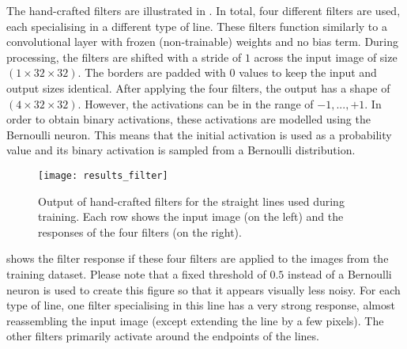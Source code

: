 The hand-crafted filters are illustrated in .
In total, four different filters are used, each specialising in a different type of line.
These filters function similarly to a convolutional layer with frozen (non-trainable) weights and no bias term. 
During processing, the filters are shifted with a stride of $1$ across the input image of size $(1 \times 32 \times 32)$. 
The borders are padded with $0$ values to keep the input and output sizes identical.
After applying the four filters, the output has a shape of $(4 \times 32 \times 32)$. 
However, the activations can be in the range of $-1, ..., +1$.
In order to obtain binary activations, these activations are modelled using the Bernoulli neuron.
This means that the initial activation is used as a probability value and its binary activation is sampled from a Bernoulli distribution.


\begin{figure}[h]
    \centering
    \texttt{[image: results\_filter]}
    \caption[Output of hand-crafted filters for straight lines]{Output of hand-crafted filters for the straight lines used during training. Each row shows the input image (on the left) and the responses of the four filters (on the right).}
\end{figure}

 shows the filter response if these four filters are applied to the images from the training dataset.
Please note that a fixed threshold of $0.5$ instead of a Bernoulli neuron is used to create this figure so that it appears visually less noisy.
For each type of line, one filter specialising in this line has a very strong response, almost reassembling the input image (except extending the line by a few pixels).
The other filters primarily activate around the endpoints of the lines.


